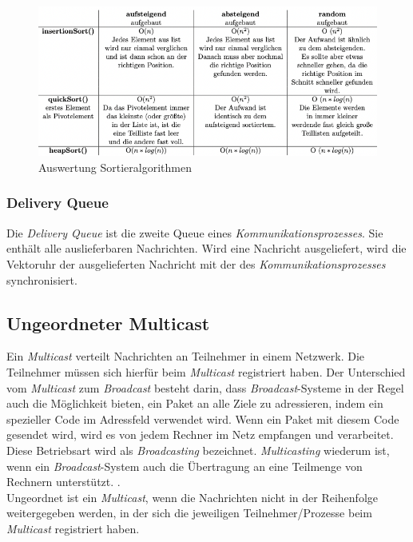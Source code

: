 \begin{figure}[htbp]
\begin{center}
\includegraphics[scale=0.59]{Latex/Bilder/sortAlgo.png}
\caption{\label{fig:sortAlgo} Auswertung Sortieralgorithmen \cite{sortAlgo}} 
\end{center}
\end{figure}

\subsubsection{Delivery Queue}

Die \textit{Delivery Queue} ist die zweite Queue eines \textit{Kommunikationsprozesses}. Sie enthält alle auslieferbaren Nachrichten.
Wird eine Nachricht ausgeliefert, wird die Vektoruhr der ausgelieferten Nachricht mit der des \textit{Kommunikationsprozesses} synchronisiert.

\newpage

\subsection{Ungeordneter Multicast} \label{unordererMulticast}

Ein \textit{Multicast} verteilt Nachrichten an Teilnehmer in einem Netzwerk. Die Teilnehmer müssen sich hierfür beim \textit{Multicast} registriert haben. Der Unterschied vom \textit{Multicast} zum \textit{Broadcast} besteht darin, dass \textit{Broadcast}-Systeme in der Regel auch die Möglichkeit bieten, ein Paket an alle Ziele zu adressieren, indem ein spezieller Code im Adressfeld verwendet wird. Wenn ein Paket mit diesem Code gesendet wird, wird es von jedem Rechner im Netz empfangen und verarbeitet. Diese Betriebsart wird als \textit{Broadcasting} bezeichnet. \textit{Multicasting} wiederum ist, wenn ein \textit{Broadcast}-System auch die Übertragung an eine Teilmenge von Rechnern unterstützt. \cite{TanenbaumWetherall11}.\\
Ungeordnet ist ein \textit{Multicast}, wenn die Nachrichten nicht in der Reihenfolge weitergegeben werden, in der sich die jeweiligen Teilnehmer/Prozesse beim \textit{Multicast} registriert haben.

